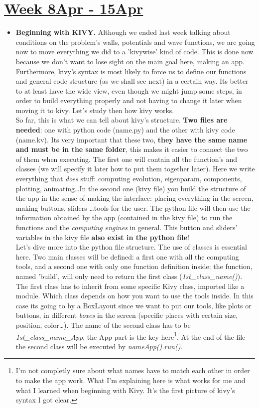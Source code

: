 \documentclass{article}
\begin{document}
\section*{\underline{Week 8Apr - 15Apr}}
\begin{itemize}
	\item \textbf{Beginning with KIVY.} Although we ended last week talking about conditions on the problem's walls, potentials and wave functions, we are going now to move everything we did to a 'kivywise' kind of code. This is done now because we don't want to lose sight on the main goal here, making an app. Furthermore,  kivy's syntax is most likely to force us to define our functions and general code structure (as we shall see next) in a certain way. Its better to at least have the wide view, even though we might jump some steps, in order to build everything properly and not having to change it later when moving it to kivy. Let's study then how kivy works. \\
	So far, this is what we can tell about kivy's structure. \textbf{Two files are needed}: one with python code (name.py) and the other with kivy code (name.kv). Its very important that these two, \textbf{they have the same name and must be in the same folder}, this makes it easier to connect the two of them when executing. The first one will contain all the function's and classes (we will specify it later how to put them together later). Here we write everything that \textit{does} stuff: computing evolution, eigenparam, components, plotting, animating\dots In the second one (kivy file) you build the structure of the app in the sense of making the interface: placing everything in the screen, making buttons, sliders \dots tools for the user. The python file will then use the information obtained by the app (contained in the kivy file) to run the functions and the \textit{computing engines} in general. This button and sliders' variables in the kivy file \textbf{also exist in the python file}! \\
	Let's dive more into the python file structure. The use of classes is essential here. Two main classes will be defined: a first one with all the computing tools, and a second one with only one function definition inside: the function, named 'build', will only need to return the first class (\textit{1st\_class\_name()}). The first class has to inherit from some specific Kivy class, imported like a module. Which class depends on how you want to use the tools inside. In this case its going to by a BoxLayout since we want to put our tools, like plots or buttons, in different \textit{boxes} in the screen (specific places with certain  size, position, color\dots). The name of the second class has to be \textit{1st\_class\_name\_App}, the App part is the key here\footnote{I'm not completly sure about what names have to match each other in order to make the app work. What I'm explaining here is what works for me and what I learned when beginning with Kivy. It's the first picture of kivy's syntax I got clear.}. At the end of the file the second class will be executed by \textit{nameApp().run()}. \\

\end{itemize}
\end{document}
